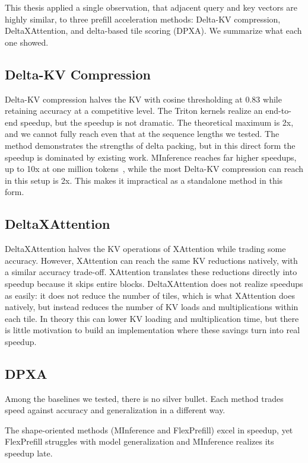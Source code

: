 This thesis applied a single observation, that adjacent query and key vectors are highly similar, to three prefill acceleration methods: Delta-KV compression, DeltaXAttention, and delta-based tile scoring (DPXA). We summarize what each one showed.

\subsection{Delta-KV Compression}
Delta-KV compression halves the KV with cosine thresholding at 0.83 while retaining accuracy at a competitive level. The Triton kernels realize an end-to-end speedup, but the speedup is not dramatic. The theoretical maximum is 2x, and we cannot fully reach even that at the sequence lengths we tested. The method demonstrates the strengths of delta packing, but in this direct form the speedup is dominated by existing work. MInference reaches far higher speedups, up to 10x at one million tokens~\citep[Figure~1b]{jiang2024minference}, while the most Delta-KV compression can reach in this setup is 2x. This makes it impractical as a standalone method in this form.

\subsection{DeltaXAttention}
DeltaXAttention halves the KV operations of XAttention while trading some accuracy. However, XAttention can reach the same KV reductions natively, with a similar accuracy trade-off. XAttention translates these reductions directly into speedup because it skips entire blocks. DeltaXAttention does not realize speedups as easily: it does not reduce the number of tiles, which is what XAttention does natively, but instead reduces the number of KV loads and multiplications within each tile. In theory this can lower KV loading and multiplication time, but there is little motivation to build an implementation where these savings turn into real speedup.

\subsection{DPXA}

Among the baselines we tested, there is no silver bullet. Each method trades speed against accuracy and generalization in a different way.

The shape-oriented methods (MInference and FlexPrefill) excel in speedup, yet FlexPrefill struggles with model generalization and MInference realizes its speedup late.

